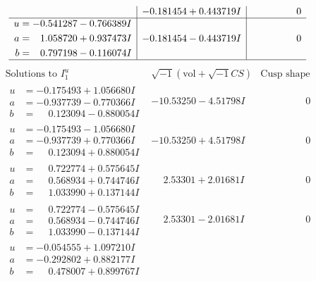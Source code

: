 \documentclass[1p]{elsarticle_modified}
\theoremstyle{definition}
\newcommand{\I}{\sqrt{-1}}
\begin{document}
$$\begin{array}{c|c|c}
 & -0.181454 + 0.443719 I & \phantom{-0.000000 } 0 \\ \hline\begin{aligned}
u &= -0.541287 - 0.766389 I \\
a &= \phantom{-}1.058720 + 0.937473 I \\
b &= \phantom{-}0.797198 - 0.116074 I\end{aligned}
 & -0.181454 - 0.443719 I & \phantom{-0.000000 } 0\\
 \hline 
 \end{array}$$\newpage$$\begin{array}{c|c|c}  
\text{Solutions to }I^u_{1}& \I (\text{vol} + \sqrt{-1}CS) & \text{Cusp shape}\\
 \hline 
\begin{aligned}
u &= -0.175493 + 1.056680 I \\
a &= -0.937739 - 0.770366 I \\
b &= \phantom{-}0.123094 - 0.880054 I\end{aligned}
 & -10.53250 - 4.51798 I & \phantom{-0.000000 } 0 \\ \hline\begin{aligned}
u &= -0.175493 - 1.056680 I \\
a &= -0.937739 + 0.770366 I \\
b &= \phantom{-}0.123094 + 0.880054 I\end{aligned}
 & -10.53250 + 4.51798 I & \phantom{-0.000000 } 0 \\ \hline\begin{aligned}
u &= \phantom{-}0.722774 + 0.575645 I \\
a &= \phantom{-}0.568934 + 0.744746 I \\
b &= \phantom{-}1.033990 + 0.137144 I\end{aligned}
 & \phantom{-}2.53301 + 2.01681 I & \phantom{-0.000000 } 0 \\ \hline\begin{aligned}
u &= \phantom{-}0.722774 - 0.575645 I \\
a &= \phantom{-}0.568934 - 0.744746 I \\
b &= \phantom{-}1.033990 - 0.137144 I\end{aligned}
 & \phantom{-}2.53301 - 2.01681 I & \phantom{-0.000000 } 0 \\ \hline\begin{aligned}
u &= -0.054555 + 1.097210 I \\
a &= -0.292802 + 0.882177 I \\
b &= \phantom{-}0.478007 + 0.899767 I\end{aligned}

\end{array}$$
\end{document}
